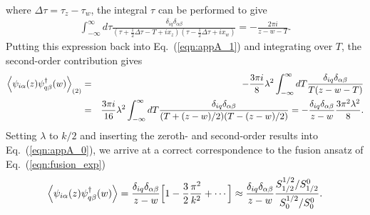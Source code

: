 \documentclass[aps,prb,twocolumn,superscriptaddress]{revtex4-1}
\begin{document}
\begin{widetext}
\begin{eqnarray}
\end{eqnarray}
where $\Delta\tau=\tau_{z}-\tau_{w}$, the integral $\tau$ can be performed to give
\begin{eqnarray}
\int_{-\infty}^{\infty}{d\tau}\frac{\delta_{iq}\delta_{\alpha\beta}}{(\tau+\frac{1}{2}\Delta\tau-T+ix_{z})(\tau-\frac{1}{2}\Delta\tau+ix_{w})}=-\frac{2\pi i}{z-w-T}. 
\end{eqnarray}
Putting this expression back into Eq.~(\ref{eqn:appA_1}) and integrating over $T$, the second-order contribution gives
\begin{eqnarray}
\Bigl\langle{\psi_{i\alpha}(z)\psi_{q\beta}^{\dagger}(w)\Bigr\rangle}_{(2)}&=&-\frac{3\pi i}{8}\lambda^{2}\int_{-\infty}^{\infty}{dT}\frac{\delta_{iq}\delta_{\alpha\beta}}{T(z-w-T)} \nonumber \\
&=&\frac{3\pi i}{16}\lambda^{2}\int_{-\infty}^{\infty}{dT}\frac{\delta_{iq}\delta_{\alpha\beta}}{(T+(z-w)/2)(T-(z-w)/2)}=-\frac{\delta_{iq}\delta_{\alpha\beta}}{z-w}\frac{3\pi^{2}\lambda^{2}}{8}. \label{eqn:appA_2} 
\end{eqnarray}
Setting $\lambda$ to $k/2$ and inserting the zeroth- and second-order results into Eq.~(\ref{eqn:appA_0}), we arrive at a correct correspondence to the fusion ansatz of Eq.~(\ref{eqn:fusion_exp})
\begin{eqnarray}
\Bigl\langle{\psi_{i\alpha}(z)\psi_{q\beta}^{\dagger}(w)\Bigr\rangle}=\frac{\delta_{iq}\delta_{\alpha\beta}}{z-w}\Bigl[1-\frac{3}{2}\frac{\pi^{2}}{k^{2}}+\cdots\Bigr]\approx\frac{\delta_{iq}\delta_{\alpha\beta}}{z-w}\frac{S_{1/2}^{1/2}/S_{1/2}^{0}}{S_{0}^{1/2}/S_{0}^{0}}. \label{eqn:appA_3} 
\end{eqnarray}



\end{widetext}
\end{document}
